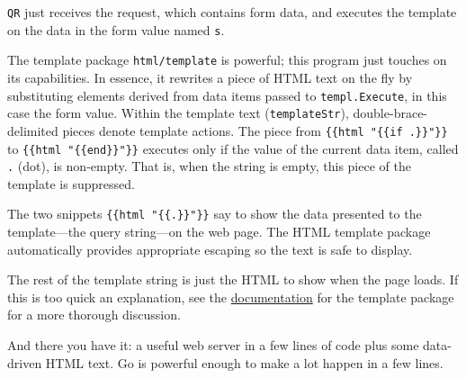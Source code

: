 \texttt{QR} just receives the request, which contains form data, and
executes the template on the data in the form value named \texttt{s}.

The template package \texttt{html/template} is powerful; this program
just touches on its capabilities. In essence, it rewrites a piece of
HTML text on the fly by substituting elements derived from data items
passed to \texttt{templ.Execute}, in this case the form value. Within
the template text (\texttt{templateStr}), double-brace-delimited pieces
denote template actions. The piece from
\texttt{\{\{html "\{\{if .\}\}"\}\}} to
\texttt{\{\{html "\{\{end\}\}"\}\}} executes only if the value of the
current data item, called \texttt{.} (dot), is non-empty. That is, when
the string is empty, this piece of the template is suppressed.

The two snippets \texttt{\{\{html "\{\{.\}\}"\}\}} say to show the data
presented to the template---the query string---on the web page. The HTML
template package automatically provides appropriate escaping so the text
is safe to display.

The rest of the template string is just the HTML to show when the page
loads. If this is too quick an explanation, see the
\href{/pkg/html/template/}{documentation} for the template package for a
more thorough discussion.

And there you have it: a useful web server in a few lines of code plus
some data-driven HTML text. Go is powerful enough to make a lot happen
in a few lines.


